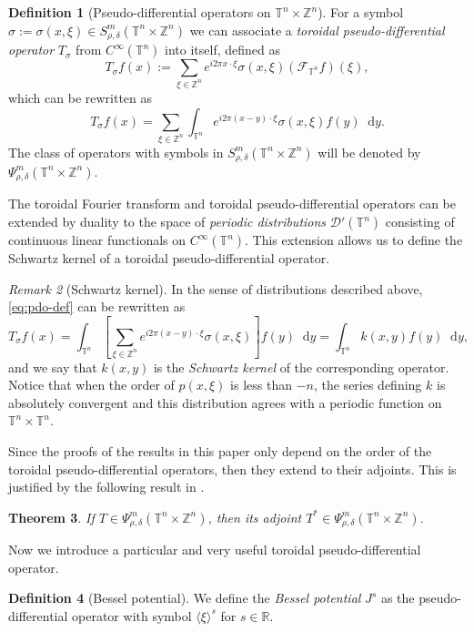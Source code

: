\documentclass[12pt, reqno]{amsart}
\newtheorem{theorem}{Theorem}[section]
\theoremstyle{definition}
\newtheorem{definition}[theorem]{Definition}
\theoremstyle{remark}
\newtheorem{remark}[theorem]{Remark}
\numberwithin{equation}{section}
\newcommand*\diff{\mathop{}\!\mathrm{d}}
\begin{document}
\begin{definition}[Pseudo-differential operators on $ \mathbb{T}^n \times \mathbb{Z}^n $]
    For a symbol $\sigma:=\sigma(x, \xi) \in S^m_{\rho,\delta} (\mathbb{T}^n\times \mathbb{Z}^n) $ we can associate a \textit{toroidal pseudo-differential operator} $T_\sigma$ from $C^\infty(\mathbb{T}^n)$ into itself, defined as  
    \begin{equation*}
        T_\sigma f(x):=\sum_{\xi \in \mathbb{Z}^n} e^{i2\pi x \cdot \xi}\sigma(x, \xi)(\mathcal{F}_{\mathbb{T}^n}f)(\xi),
    \end{equation*}
    which can be rewritten as 
    \begin{equation}
        T_\sigma f(x)=  \sum_{\xi \in \mathbb{Z}^n} \int_{\mathbb{T}^n} e^{i2\pi (x-y) \cdot \xi} \sigma(x, \xi)f(y) \diff y .
        \label{eq:pdo-def}
    \end{equation}
    The class of operators with symbols in $S^m_{\rho,\delta} (\mathbb{T}^n\times \mathbb{Z}^n) $ will be denoted  by $\Psi^m_{\rho,\delta} (\mathbb{T}^n\times \mathbb{Z}^n) $.
\end{definition}
    The toroidal Fourier transform and toroidal pseudo-differential operators can be extended by duality to the space of \textit{periodic distributions} $\mathcal{D}'(\mathbb{T}^n)$ consisting of continuous linear functionals on $C^\infty(\mathbb{T}^n)$. This extension allows us to define the Schwartz kernel of a toroidal pseudo-differential operator.
\begin{remark}[Schwartz kernel]
    In the sense of distributions described above, \cref{eq:pdo-def} can be rewritten as
    \begin{equation*}
         T_\sigma f(x)=\int_{\mathbb{T}^n}\left[\sum_{\xi \in \mathbb{Z}^n} e^{i2\pi(x - y) \cdot \xi} \sigma(x, \xi)\right]f(y)\diff y = \int_{\mathbb{T}^n}k(x, y)f(y)\diff y,
    \end{equation*}
    and we say that $k(x, y)$ is the \textit{Schwartz kernel} of the corresponding operator. Notice that when the order of $p(x, \xi)$ is less than $-n$, the series defining $k$ is absolutely convergent and this distribution agrees with a periodic function on $\mathbb{T}^n\times\mathbb{T}^n$.
\end{remark}
Since the proofs of the results in this paper only depend on the order of the toroidal pseudo-differential operators, then they extend to their adjoints. This is justified by the following result in \cite[Corollary~4.9.8]{ruzhansky-turunen}.
\begin{theorem}
    If $T \in \Psi^m_{\rho,\delta} (\mathbb{T}^n \times \mathbb{Z}^n) $, then its adjoint $T^* \in \Psi^m_{\rho,\delta} (\mathbb{T}^n \times \mathbb{Z}^n) $.
\end{theorem}
Now we introduce a particular and very useful toroidal pseudo-differential operator.
\begin{definition}[Bessel potential]
    We define the \textit{Bessel potential} $J^s$ as the pseudo-differential operator with symbol $\langle\xi\rangle^s$ for $s \in \mathbb{R}$.
\end{definition}
\end{document}
